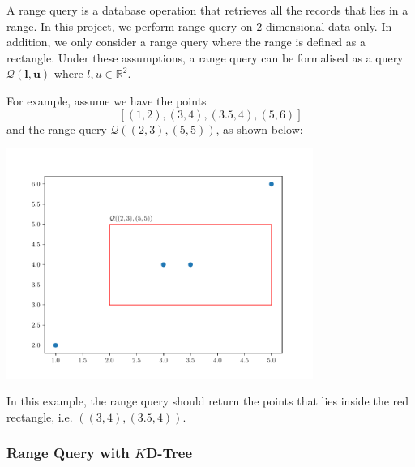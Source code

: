 A range query is a database operation that retrieves all the records that lies in a range. In this project, we perform range query on $2$-dimensional data only. In addition, we only consider a range query where the range is defined as a rectangle. Under these assumptions, a range query can be formalised as a query $\mathcal{Q}(\boldsymbol{l}, \boldsymbol{u})$ where $l,u\in\mathbb{R}^2$.

\begin{mscexample}
	For example, assume we have the points
	$$
	[(1,2), (3,4), (3.5, 4), (5,6)]
	$$
	and the range query $\mathcal{Q}((2,3), (5,5))$, as shown below:
	
	\begin{minipage}[t]{\linewidth}
	\centering
   	\includegraphics[width=10cm]{graphs/implementation/queries/range_query.pdf}
   	\label{fig:range_query_demo}
	\end{minipage}
	
In this example, the range query should return the points that lies inside the red rectangle, i.e. $((3,4), (3.5, 4))$.

\end{mscexample}

\subsubsection{Range Query with $K$D-Tree}

